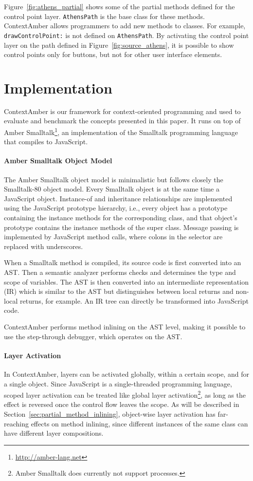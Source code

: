 \documentclass{sig-alternate}
\begin{document}
Figure~\ref{fig:athens_partial} shows some of the partial methods defined for the control point layer. \texttt{AthensPath} is the base class for these methods. ContextAmber allows programmers to add new methods to classes. For example, \texttt{drawControlPoint:} is not defined on \texttt{AthensPath}. By activating the control point layer on the path defined in Figure~\ref{fig:source_athens}, it is possible to show control points only for buttons, but not for other user interface elements.

\section{Implementation}
\label{sec:impl}
ContextAmber is our framework for context-oriented programming and used to evaluate and benchmark the concepts presented in this paper. It runs on top of Amber Smalltalk\footnote{\url{http://amber-lang.net}}, an implementation of the Smalltalk programming language that compiles to JavaScript.

\paragraph{Amber Smalltalk Object Model}
The Amber Smalltalk object model is minimalistic but follows closely the Smalltalk-80 object model. Every Smalltalk object is at the same time a JavaScript object. Instance-of and inheritance relationships are implemented using the JavaScript prototype hierarchy, i.e., every object has a prototype containing the instance methods for the corresponding class, and that object's prototype contains the instance methods of the super class. Message passing is implemented by JavaScript method calls, where colons in the selector are replaced with underscores.

When a Smalltalk method is compiled, its source code is first converted into an AST. Then a semantic analyzer performs checks and determines the type and scope of variables. The AST is then converted into an intermediate representation (IR) which is similar to the AST but distinguishes between local returns and non-local returns, for example. An IR tree can directly be transformed into JavaScript code.

ContextAmber performs method inlining on the AST level, making it possible to use the step-through debugger, which operates on the AST.

\paragraph{Layer Activation}
In ContextAmber, layers can be activated globally, within a certain scope, and for a single object. Since JavaScript is a single-threaded programming language, scoped layer activation can be treated like global layer activation\footnote{Amber Smalltalk does currently not support processes.}, as long as the effect is reversed once the control flow leaves the scope. As will be described in Section~\ref{sec:partial_method_inlining}, object-wise layer activation has far-reaching effects on method inlining, since different instances of the same class can have different layer compositions.
\end{document}
